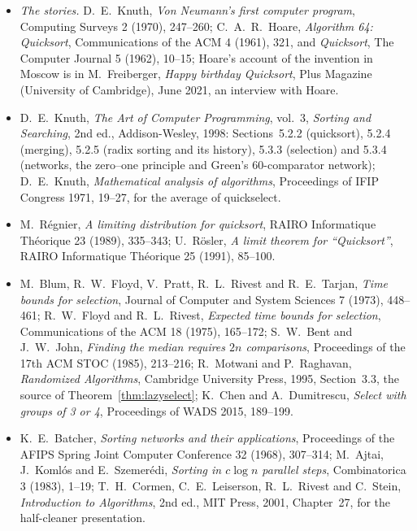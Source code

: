 \begin{itemize}
\item \emph{The stories.} D.~E.~Knuth, \emph{Von Neumann's first computer program}, Computing Surveys 2 (1970), 247--260; C.~A.~R.~Hoare, \emph{Algorithm 64: Quicksort}, Communications of the ACM 4 (1961), 321,
and \emph{Quicksort}, The Computer Journal 5 (1962), 10--15; Hoare's account of the invention in Moscow is in M.~Freiberger, \emph{Happy birthday Quicksort}, Plus Magazine (University of Cambridge), June 2021, an
interview with Hoare.
\item D.~E.~Knuth, \emph{The Art of Computer Programming}, vol.~3, \emph{Sorting and Searching}, 2nd ed., Addison-Wesley, 1998: Sections~5.2.2 (quicksort), 5.2.4 (merging), 5.2.5 (radix sorting and its history),
5.3.3 (selection) and 5.3.4 (networks, the zero--one principle and Green's $60$-comparator network); D.~E.~Knuth, \emph{Mathematical analysis of algorithms}, Proceedings of IFIP Congress 1971, 19--27, for the average of quickselect.
\item M.~R\'egnier, \emph{A limiting distribution for quicksort}, RAIRO Informatique Th\'eorique 23 (1989), 335--343; U.~R\"osler, \emph{A limit theorem for ``Quicksort''}, RAIRO Informatique Th\'eorique 25 (1991), 85--100.
\item M.~Blum, R.~W.~Floyd, V.~Pratt, R.~L.~Rivest and R.~E.~Tarjan, \emph{Time bounds for selection}, Journal of Computer and System Sciences 7 (1973), 448--461; R.~W.~Floyd and R.~L.~Rivest, \emph{Expected time bounds for
selection}, Communications of the ACM 18 (1975), 165--172; S.~W.~Bent and J.~W.~John, \emph{Finding the median requires $2n$ comparisons}, Proceedings of the 17th ACM STOC (1985), 213--216; R.~Motwani and P.~Raghavan,
\emph{Randomized Algorithms}, Cambridge University Press, 1995, Section~3.3, the source of Theorem~\ref{thm:lazyselect}; K.~Chen and A.~Dumitrescu, \emph{Select with groups of 3 or 4}, Proceedings of WADS 2015, 189--199.
\item K.~E.~Batcher, \emph{Sorting networks and their applications}, Proceedings of the AFIPS Spring Joint Computer Conference 32 (1968), 307--314; M.~Ajtai, J.~Koml\'os and E.~Szemer\'edi, \emph{Sorting in $c\log n$ parallel
steps}, Combinatorica 3 (1983), 1--19; T.~H.~Cormen, C.~E.~Leiserson, R.~L.~Rivest and C.~Stein, \emph{Introduction to Algorithms}, 2nd ed., MIT Press, 2001, Chapter~27, for the half-cleaner presentation.
\end{itemize}
